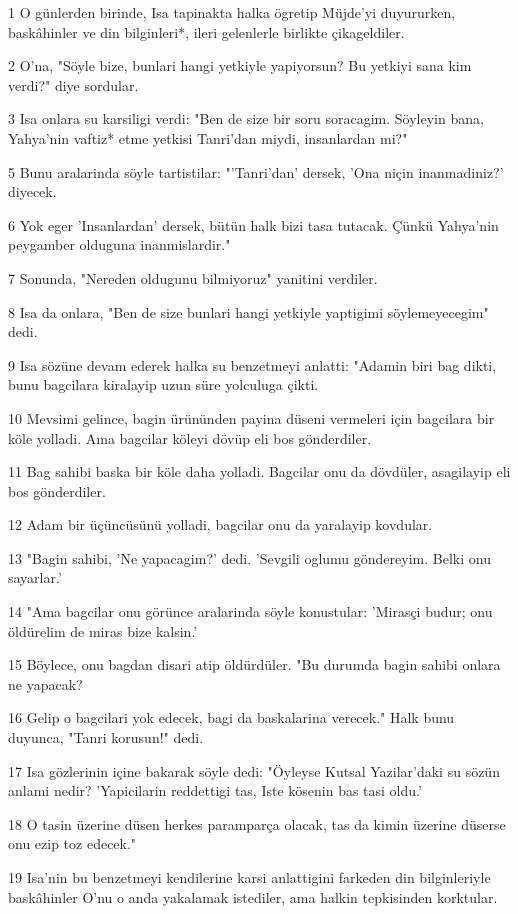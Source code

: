 \par 1 O günlerden birinde, Isa tapinakta halka ögretip Müjde'yi duyururken, baskâhinler ve din bilginleri*, ileri gelenlerle birlikte çikageldiler.
\par 2 O'na, "Söyle bize, bunlari hangi yetkiyle yapiyorsun? Bu yetkiyi sana kim verdi?" diye sordular.
\par 3 Isa onlara su karsiligi verdi: "Ben de size bir soru soracagim. Söyleyin bana, Yahya'nin vaftiz* etme yetkisi Tanri'dan miydi, insanlardan mi?"
\par 5 Bunu aralarinda söyle tartistilar: "'Tanri'dan' dersek, 'Ona niçin inanmadiniz?' diyecek.
\par 6 Yok eger 'Insanlardan' dersek, bütün halk bizi tasa tutacak. Çünkü Yahya'nin peygamber olduguna inanmislardir."
\par 7 Sonunda, "Nereden oldugunu bilmiyoruz" yanitini verdiler.
\par 8 Isa da onlara, "Ben de size bunlari hangi yetkiyle yaptigimi söylemeyecegim" dedi.
\par 9 Isa sözüne devam ederek halka su benzetmeyi anlatti: "Adamin biri bag dikti, bunu bagcilara kiralayip uzun süre yolculuga çikti.
\par 10 Mevsimi gelince, bagin ürününden payina düseni vermeleri için bagcilara bir köle yolladi. Ama bagcilar köleyi dövüp eli bos gönderdiler.
\par 11 Bag sahibi baska bir köle daha yolladi. Bagcilar onu da dövdüler, asagilayip eli bos gönderdiler.
\par 12 Adam bir üçüncüsünü yolladi, bagcilar onu da yaralayip kovdular.
\par 13 "Bagin sahibi, 'Ne yapacagim?' dedi. 'Sevgili oglumu göndereyim. Belki onu sayarlar.'
\par 14 "Ama bagcilar onu görünce aralarinda söyle konustular: 'Mirasçi budur; onu öldürelim de miras bize kalsin.'
\par 15 Böylece, onu bagdan disari atip öldürdüler. "Bu durumda bagin sahibi onlara ne yapacak?
\par 16 Gelip o bagcilari yok edecek, bagi da baskalarina verecek." Halk bunu duyunca, "Tanri korusun!" dedi.
\par 17 Isa gözlerinin içine bakarak söyle dedi: "Öyleyse Kutsal Yazilar'daki su sözün anlami nedir? 'Yapicilarin reddettigi tas, Iste kösenin bas tasi oldu.'
\par 18 O tasin üzerine düsen herkes paramparça olacak, tas da kimin üzerine düserse onu ezip toz edecek."
\par 19 Isa'nin bu benzetmeyi kendilerine karsi anlattigini farkeden din bilginleriyle baskâhinler O'nu o anda yakalamak istediler, ama halkin tepkisinden korktular.
